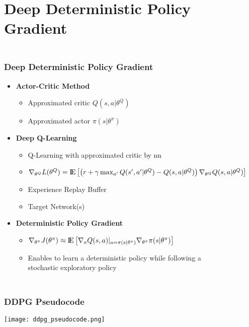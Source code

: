 \documentclass[accentcolor=tud1d,colorbacktitle,inverttitle,landscape,german,presentation,t]{tudbeamer}
\begin{document}
\section{Deep Deterministic Policy Gradient}
	\begin{frame}
		\frametitle{\\Deep Deterministic Policy Gradient}
		\begin{itemize}
			\item \textbf{Actor-Critic Method}
			\begin{itemize}
				\item Approximated critic $Q(s,a|\theta^Q)$
				\item Approximated actor $\pi(s|\theta^\pi)$
			\end{itemize}
			\vspace{2mm}
			\item \textbf{Deep Q-Learning}
			\begin{itemize}
				\item Q-Learning with approximated critic by nn
				\item $\nabla_{\theta^Q}L(\theta^Q)={\rm I\!E} \left[\left(r+\gamma \max_{a'} Q(s', 
				a'|\theta^Q)-Q(s,a|\theta^Q)\right)\nabla_{\theta^Q}Q(s,a|\theta^Q)\right] $
				\item Experience Replay Buffer
				\item Target Network(s)
			\end{itemize}
			\vspace{2mm}
			\item \textbf{Deterministic Policy Gradient}
			\begin{itemize}
				\item $\nabla_{\theta^\pi}J(\theta^\pi)\approx {\rm I\!E}\left[\nabla_aQ(s,a)|_{a=\pi(s|\theta^\pi)} \nabla_{\theta^\pi}\pi(s|\theta^\pi)\right]$
				\item Enables to learn a deterministic policy while following a \\stochastic exploratory policy
			\end{itemize}
		\end{itemize}
	\end{frame}
	\begin{frame}
		\frametitle{\\DDPG Pseudocode}
		\centering
		\vspace{-4.5mm}
		\texttt{[image: ddpg\_pseudocode.png]}
	\end{frame}
\end{document}
